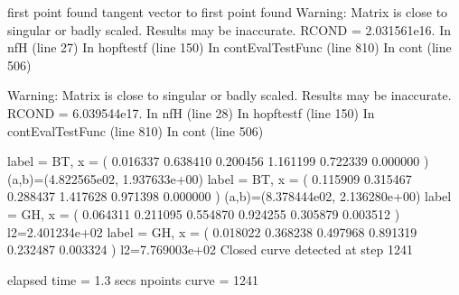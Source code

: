 \documentclass[letterpaper,10pt,english]{jupyterBook}
\begin{document}
\begin{sphinxVerbatim}[commandchars=\\\{\}]
\PYG{p}{[}\PYG{p}{]}
\end{sphinxVerbatim}

\begin{sphinxVerbatim}[commandchars=\\\{\}]
first point found
tangent vector to first point found
Warning: Matrix is close to singular or badly scaled. Results may be inaccurate. RCOND =  2.031561e\PYGZhy{}16.
\PYGZgt{} In nf\PYGZus{}H (line 27)
In hopf\PYGZgt{}testf (line 150)
In cont\PYGZgt{}EvalTestFunc (line 810)
In cont (line 506)

Warning: Matrix is close to singular or badly scaled. Results may be inaccurate. RCOND =  6.039544e\PYGZhy{}17.
\PYGZgt{} In nf\PYGZus{}H (line 28)
In hopf\PYGZgt{}testf (line 150)
In cont\PYGZgt{}EvalTestFunc (line 810)
In cont (line 506)

label = BT, x = ( 0.016337 0.638410 0.200456 1.161199 0.722339 0.000000 )
(a,b)=(\PYGZhy{}4.822565e\PYGZhy{}02, \PYGZhy{}1.937633e+00)
label = BT, x = ( 0.115909 0.315467 0.288437 1.417628 0.971398 0.000000 )
(a,b)=(8.378444e\PYGZhy{}02, 2.136280e+00)
label = GH, x = ( 0.064311 0.211095 0.554870 0.924255 0.305879 0.003512 )
l2=\PYGZhy{}2.401234e+02
label = GH, x = ( 0.018022 0.368238 0.497968 0.891319 0.232487 0.003324 )
l2=\PYGZhy{}7.769003e+02
Closed curve detected at step 1241

elapsed time  = 1.3 secs
npoints curve = 1241
\end{sphinxVerbatim}
\end{document}
